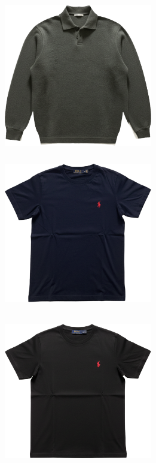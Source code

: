 \documentclass[10pt]{article}
\begin{document}
\begin{minipage}[c][64.75mm][c]{64.75mm}\centering
\includegraphics[width=64.75mm,height=64.75mm,keepaspectratio]{assets/midlayer/green-polo-longsleeve.png}\
\end{minipage} \hspace*{6.00mm} \begin{minipage}[c][64.75mm][c]{64.75mm}\centering
\includegraphics[width=64.75mm,height=64.75mm,keepaspectratio]{assets/tees/navy-polo-tee-red-horse.png}\
\end{minipage} \hspace*{6.00mm} \begin{minipage}[c][64.75mm][c]{64.75mm}\centering
\includegraphics[width=64.75mm,height=64.75mm,keepaspectratio]{assets/tees/black-polo-tee-red-horse.png}\
\end{minipage}\
\newpage
\end{document}
